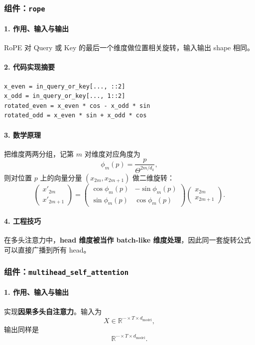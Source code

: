 \documentclass[UTF8,a4paper,11pt]{ctexart}
\begin{document}
\subsubsection{组件：\texttt{rope}}
\paragraph{1. 作用、输入与输出}
RoPE 对 Query 或 Key 的最后一个维度做位置相关旋转，输入输出 shape 相同。

\paragraph{2. 代码实现摘要}
\begin{lstlisting}
x_even = in_query_or_key[..., ::2]
x_odd = in_query_or_key[..., 1::2]
rotated_even = x_even * cos - x_odd * sin
rotated_odd = x_even * sin + x_odd * cos
\end{lstlisting}

\paragraph{3. 数学原理}
把维度两两分组，记第 \(m\) 对维度对应角度为
\[
\phi_m(p)=\frac{p}{\Theta^{2m/d_k}},
\]
则对位置 \(p\) 上的向量分量 \((x_{2m},x_{2m+1})\) 做二维旋转：
\[
\begin{pmatrix}
x'_{2m} \\
x'_{2m+1}
\end{pmatrix}
=
\begin{pmatrix}
\cos \phi_m(p) & -\sin \phi_m(p) \\
\sin \phi_m(p) & \cos \phi_m(p)
\end{pmatrix}
\begin{pmatrix}
x_{2m} \\
x_{2m+1}
\end{pmatrix}.
\]

\paragraph{4. 工程技巧}
在多头注意力中，\textbf{head 维度被当作 batch-like 维度处理}，因此同一套旋转公式可以直接广播到所有 head。

\subsubsection{组件：\texttt{multihead\_self\_attention}}
\paragraph{1. 作用、输入与输出}
实现\textbf{因果多头自注意力}。输入为
\[
X \in \mathbb{R}^{\cdots \times T \times d_{\text{model}}},
\]
输出同样是
\[
\mathbb{R}^{\cdots \times T \times d_{\text{model}}}.
\]
\end{document}
